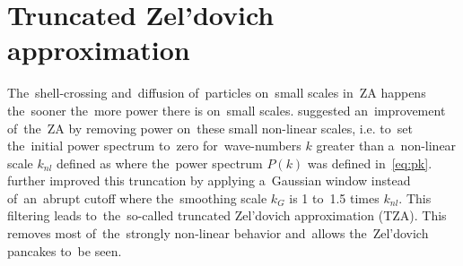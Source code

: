 \section{Truncated Zel'dovich approximation}
The~shell-crossing and~diffusion of~particles on~small scales in~ZA happens the~sooner the~more power there is on~small scales. \textcite{1993MNRAS.260..765C} suggested an~improvement of~the~ZA by removing power on~these small non-linear scales, i.e. to~set the~initial power spectrum to~zero for~wave-numbers $k$ greater than a~non-linear scale $k_{nl}$ defined as
where the~power spectrum $P(k)$ was defined in~\eqref{eq:pk}. \textcite{doi:10.1093/mnras/269.3.626} further improved this truncation by applying a~Gaussian window instead of~an~abrupt cutoff
where the~smoothing scale $k_{G}$ is 1 to~1.5 times $k_{nl}$. This filtering leads to~the~so-called truncated Zel'dovich approximation (TZA). This removes most of~the~strongly non-linear behavior and~allows the~Zel’dovich pancakes to~be seen.

